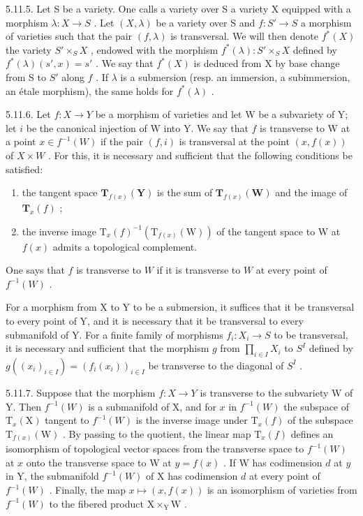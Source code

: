 5.11.5. Let S be a variety. One calls a variety over S a variety X equipped with a morphism \(\lambda: X \to S\) . Let \((X, \lambda)\) be a variety over S and \(f: S' \to S\) a morphism of varieties such that the pair \((f, \lambda)\) is transversal. We will then denote \(f^*(X)\) the variety \(S' \times_{S} X\) , endowed with the morphism \(f^*(\lambda): S' \times_{S} X\) defined by \(f^*(\lambda)(s', x) = s'\) . We say that \(f^*(X)\) is deduced from X by base change from S to \(S'\) along \(f\) . If \(\lambda\) is a submersion (resp. an immersion, a subimmersion, an étale morphism), the same holds for \(f^*(\lambda)\) .

5.11.6. Let \(f: X \to Y\) be a morphism of varieties and let W be a subvariety of Y; let \(i\) be the canonical injection of W into Y. We say that \(f\) is transverse to W at a point \(x \in f^{-1}(W)\) if the pair \((f, i)\) is transversal at the point \((x, f(x))\) of \(X \times W\) . For this, it is necessary and sufficient that the following conditions be satisfied:

\begin{enumerate}
\def\labelenumi{(\roman{enumi})}
\item
  the tangent space \(\mathbf{T}_{f(x)}(\mathbf{Y})\) is the sum of \(\mathbf{T}_{f(x)}(\mathbf{W})\) and the image of \(\mathbf{T}_{x}(f)\) ;
\item
  the inverse image \(\mathrm{T}_{x}(f)^{-1}(\mathrm{T}_{f(x)}(\mathrm{W}))\) of the tangent space to W at \(f(x)\) admits a topological complement.
\end{enumerate}

One says that \(f\) is transverse to \(W\) if it is transverse to \(W\) at every point of \(f^{-1}(W)\) .

For a morphism from X to Y to be a submersion, it suffices that it be transversal to every point of Y, and it is necessary that it be transversal to every submanifold of Y. For a finite family of morphisms \(f_{i}:X_{i}\to S\) to be transversal, it is necessary and sufficient that the morphism \(g\) from \(\prod_{i\in I}X_{i}\) to \(S^{I}\) defined by \(g((x_{i})_{i\in I})=(f_{i}(x_{i}))_{i\in I}\) be transverse to the diagonal of \(S^{I}\) .

5.11.7. Suppose that the morphism \(f:X\to Y\) is transverse to the subvariety W of Y. Then \(f^{-1}(W)\) is a submanifold of X, and for \(x\) in \(f^{-1}(W)\) the subspace of \(\mathrm{T}_{x}(\mathrm{X})\) tangent to \(f^{-1}(W)\) is the inverse image under \(\mathrm{T}_{x}(f)\) of the subspace \(\mathrm{T}_{f(x)}(\mathrm{W})\) . By passing to the quotient, the linear map \(\mathrm{T}_{x}(f)\) defines an isomorphism of topological vector spaces from the transverse space to \(f^{-1}(W)\) at \(x\) onto the transverse space to W at \(y=f(x)\) . If W has codimension \(d\) at \(y\) in Y, the submanifold \(f^{-1}(W)\) of X has codimension \(d\) at every point of \(f^{-1}(W)\) . Finally, the map \(x\mapsto(x,f(x))\) is an isomorphism of varieties from \(f^{-1}(W)\) to the fibered product \(\mathrm{X}\times_{\mathrm{Y}}\mathrm{W}\) .

